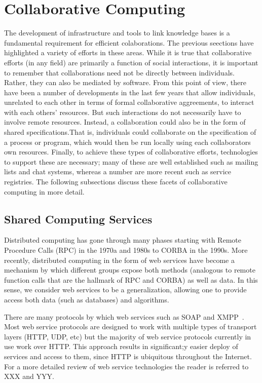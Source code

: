\documentclass[12pt]{book}
\begin{document}
\section{Collaborative Computing}

The development of infrastructure and tools to link knowledge bases is
a fundamental requirement for efficient colaborations. The previous
seections have highlighted a variety of efforts in these areas. While
it is true that collaborative efforts (in any field) are primarily a
function of social interactions, it is important to remember that
collaborations need not be directly between individuals. Rather, they
can also be mediated by software. From this point of view, there have
been a number of developments in the last few years that allow
individuals, unrelated to each other in terms of formal collaborative
aggreements, to interact with each others' resources. But such
interactions do not necessarily have to involve remote
resources. Instead, a collaboration could also be in the form of
shared specifications.That is, individuals could collaborate on the
specification of a process or program, which would then be run locally
using each collaborators own resources. Finally, to achieve these
types of collaborative efforts, technologies to support these are
necessary; many of these are well established such as mailing lists
and chat systems, whereas a number are more recent such as service
registries. The following subsections discuss these facets of
collaborative computing in more detail.

\subsection{Shared Computing Services}
\label{ref:ws}
Distributed computing has gone through many phases starting with
Remote Procedure Calls (RPC) in the 1970a and 1980s to CORBA in the
1990s. More recently, distributed computing in the form of web
services have become a mechanism by which different groups expose both
methods (analogous to remote function calls that are the hallmark of
RPC and CORBA) as well as data. In this sense, we consider web
services to be a generalization, allowing one to provide access both
data (such as databases) and algorithms.

There are many protocols by which web services such as SOAP and
XMPP~\cite{Wagener2009}. Most web service protocols are designed to
work with multiple types of transport layers (HTTP, UDP, etc) but the
majority of web service protocols currently in use work over
HTTP. This approach results in significant;y easier deploy of services
and access to them, since HTTP is ubiquitous throughout the
Internet. For a more detailed review of web service technologies the
reader is referred to XXX and YYY.
\end{document}
